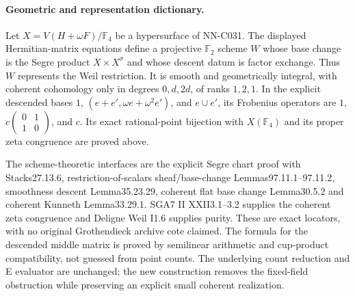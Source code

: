 \paragraph{Geometric and representation dictionary.}
Let $X=V(H+\omega F)/\mathbb F_4$ be a hypersurface of NN-C031. The displayed Hermitian-matrix equations define a projective $\mathbb F_2$ scheme $W$ whose base change is the Segre product $X\times X^\sigma$ and whose descent datum is factor exchange. Thus $W$ represents the Weil restriction. It is smooth and geometrically integral, with coherent cohomology only in degrees $0,d,2d$, of ranks $1,2,1$. In the explicit descended bases $1$, $(e+e',\omega e+\omega^2e')$, and $e\cup e'$, its Frobenius operators are $1$, $c\left(\begin{smallmatrix}0&1\\1&0\end{smallmatrix}\right)$, and $c$. Its exact rational-point bijection with $X(\mathbb F_4)$ and its proper zeta congruence are proved above.

The scheme-theoretic interfaces are the explicit Segre chart proof with Stacks27.13.6, restriction-of-scalars sheaf/base-change Lemmas97.11.1--97.11.2, smoothness descent Lemma35.23.29, coherent flat base change Lemma30.5.2 and coherent Kunneth Lemma33.29.1. SGA7 II XXII3.1--3.2 supplies the coherent zeta congruence and Deligne Weil I1.6 supplies purity. These are exact locators, with no original Grothendieck archive cote claimed. The formula for the descended middle matrix is proved by semilinear arithmetic and cup-product compatibility, not guessed from point counts. The underlying count reduction and E evaluator are unchanged; the new construction removes the fixed-field obstruction while preserving an explicit small coherent realization.



